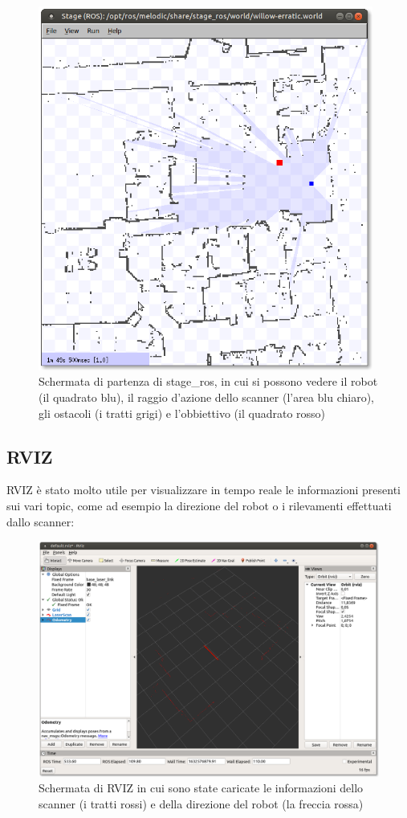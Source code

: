 \documentclass[Lau, binding=0.6cm, oneside]{sapthesis}
\begin{document}
\begin{figure}[H]
    \centering
    \includegraphics[width=11cm]{stage_ros.png}
    \caption{Schermata di partenza di stage\_ros, in cui si possono vedere il robot (il quadrato blu), il raggio d'azione dello scanner (l'area blu chiaro), gli ostacoli (i tratti grigi) e l'obbiettivo (il quadrato rosso)}
    \label{fig:stage_ros}
\end{figure}

\subsection{RVIZ}
RVIZ è stato molto utile per visualizzare in tempo reale le informazioni presenti sui vari topic, come ad esempio la direzione del robot o i rilevamenti effettuati dallo scanner:

\begin{figure}[H]
    \centering
    \includegraphics[width=13cm]{rviz.png}
    \caption{Schermata di RVIZ in cui sono state caricate le informazioni dello scanner (i tratti rossi) e della direzione del robot (la freccia rossa)}
    \label{fig:rviz}
\end{figure}
\end{document}
